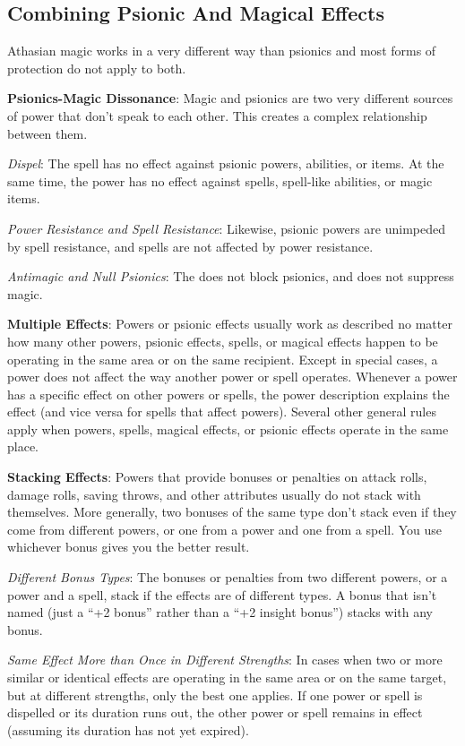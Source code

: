 \subsection{Combining Psionic And Magical Effects}
Athasian magic works in a very different way than psionics and most forms of protection do not apply to both.

\textbf{Psionics-Magic Dissonance}: Magic and psionics are two very different sources of power that don't speak to each other. This creates a complex relationship between them.

\textit{Dispel}: The  spell has no effect against psionic powers, abilities, or items. At the same time, the  power has no effect against spells, spell-like abilities, or magic items.

\textit{Power Resistance and Spell Resistance}: Likewise, psionic powers are unimpeded by spell resistance, and spells are not affected by power resistance.

\textit{Antimagic and Null Psionics}: The  does not block psionics, and  does not suppress magic.

\textbf{Multiple Effects}: Powers or psionic effects usually work as described no matter how many other powers, psionic effects, spells, or magical effects happen to be operating in the same area or on the same recipient. Except in special cases, a power does not affect the way another power or spell operates. Whenever a power has a specific effect on other powers or spells, the power description explains the effect (and vice versa for spells that affect powers). Several other general rules apply when powers, spells, magical effects, or psionic effects operate in the same place.

\textbf{Stacking Effects}: Powers that provide bonuses or penalties on attack rolls, damage rolls, saving throws, and other attributes usually do not stack with themselves. More generally, two bonuses of the same type don't stack even if they come from different powers, or one from a power and one from a spell. You use whichever bonus gives you the better result.

\textit{Different Bonus Types}: The bonuses or penalties from two different powers, or a power and a spell, stack if the effects are of different types. A bonus that isn't named (just a ``+2 bonus'' rather than a ``+2 insight bonus'') stacks with any bonus.

\textit{Same Effect More than Once in Different Strengths}: In cases when two or more similar or identical effects are operating in the same area or on the same target, but at different strengths, only the best one applies. If one power or spell is dispelled or its duration runs out, the other power or spell remains in effect (assuming its duration has not yet expired).

